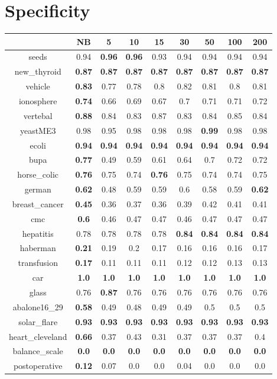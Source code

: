 \documentclass{article}%
\begin{document}
%
\section*{Specificity}%
\begin{tabular}{c|cccccccc}%
\hline%
&NB&5&10&15&30&50&100&200\\%
\hline%
seeds&0.94&\textbf{0.96}&\textbf{0.96}&0.93&0.94&0.94&0.94&0.94\\%
new\_thyroid&\textbf{0.87}&\textbf{0.87}&\textbf{0.87}&\textbf{0.87}&\textbf{0.87}&\textbf{0.87}&\textbf{0.87}&\textbf{0.87}\\%
vehicle&\textbf{0.83}&0.77&0.78&0.8&0.82&0.81&0.8&0.81\\%
ionosphere&\textbf{0.74}&0.66&0.69&0.67&0.7&0.71&0.71&0.72\\%
vertebal&\textbf{0.88}&0.84&0.83&0.87&0.83&0.84&0.85&0.84\\%
yeastME3&0.98&0.95&0.98&0.98&0.98&\textbf{0.99}&0.98&0.98\\%
ecoli&\textbf{0.94}&\textbf{0.94}&\textbf{0.94}&\textbf{0.94}&\textbf{0.94}&\textbf{0.94}&\textbf{0.94}&\textbf{0.94}\\%
bupa&\textbf{0.77}&0.49&0.59&0.61&0.64&0.7&0.72&0.72\\%
horse\_colic&\textbf{0.76}&0.75&0.74&\textbf{0.76}&0.75&0.74&0.74&0.75\\%
german&\textbf{0.62}&0.48&0.59&0.59&0.6&0.58&0.59&\textbf{0.62}\\%
breast\_cancer&\textbf{0.45}&0.36&0.37&0.36&0.39&0.42&0.41&0.41\\%
cmc&\textbf{0.6}&0.46&0.47&0.47&0.46&0.47&0.47&0.47\\%
hepatitis&0.78&0.78&0.78&0.78&\textbf{0.84}&\textbf{0.84}&\textbf{0.84}&\textbf{0.84}\\%
haberman&\textbf{0.21}&0.19&0.2&0.17&0.16&0.16&0.16&0.17\\%
transfusion&\textbf{0.17}&0.11&0.11&0.11&0.12&0.12&0.13&0.13\\%
car&\textbf{1.0}&\textbf{1.0}&\textbf{1.0}&\textbf{1.0}&\textbf{1.0}&\textbf{1.0}&\textbf{1.0}&\textbf{1.0}\\%
glass&0.76&\textbf{0.87}&0.76&0.76&0.76&0.76&0.76&0.76\\%
abalone16\_29&\textbf{0.58}&0.49&0.48&0.49&0.49&0.5&0.5&0.5\\%
solar\_flare&\textbf{0.93}&\textbf{0.93}&\textbf{0.93}&\textbf{0.93}&\textbf{0.93}&\textbf{0.93}&\textbf{0.93}&\textbf{0.93}\\%
heart\_cleveland&\textbf{0.66}&0.37&0.43&0.31&0.37&0.37&0.37&0.4\\%
balance\_scale&\textbf{0.0}&\textbf{0.0}&\textbf{0.0}&\textbf{0.0}&\textbf{0.0}&\textbf{0.0}&\textbf{0.0}&\textbf{0.0}\\%
postoperative&\textbf{0.12}&0.07&0.0&0.0&0.04&0.0&0.0&0.0\\%
\end{tabular}
\end{document}
